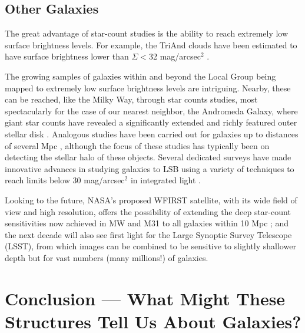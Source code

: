 \documentclass[galaxies,article,submit,moreauthors,pdftex,10pt,a4paper]{mdpi}
\begin{document}
\subsection{Other Galaxies}

The great advantage of star-count studies is the ability to reach extremely low surface brightness levels. For example, the TriAnd clouds have been estimated to have surface brightness lower than
$\Sigma <$32 mag/arcsec$^2$ \cite{majewski04}.

The growing samples of galaxies within and beyond the Local Group being mapped to extremely low surface brightness levels are intriguing.
Nearby, these can be reached, like the Milky Way, through star counts studies, most spectacularly for the case of our nearest neighbor, the Andromeda Galaxy, where giant star counts have revealed a significantly extended and richly featured outer stellar disk \cite{ferguson02,ibata05}.
Analogous studies have been carried out for galaxies up to distances of several Mpc \cite[e.g.,][]{monachesi13,crnojevi16}, although the focus of these studies has typically been on detecting the stellar halo of these objects.
Several dedicated surveys have made innovative advances in studying galaxies to LSB using a variety of techniques to reach limits below 30  mag/arcsec$^2$ in integrated light \citep[e.g.][]{delgado10,vandokkum14,duc15}.

Looking to the future,
NASA's proposed WFIRST satellite, with its wide field of view and high resolution, offers the possibility of extending the deep star-count sensitivities now achieved in MW and M31 to all galaxies within 10 Mpc \cite{spergel13}; and
the next decade will also see first light for the Large Synoptic Survey Telescope (LSST), from which images can be combined to be sensitive to slightly shallower depth \citep[$\sim$29 mag/arcsec$^2$, see][]{ivezic08} but for vast numbers (many millions!) of galaxies.


\section{Conclusion --- What Might These Structures Tell Us About Galaxies?}
\end{document}
